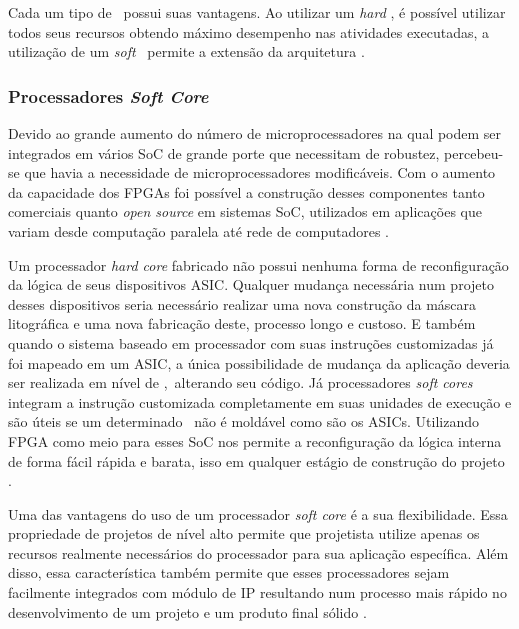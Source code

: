         Cada um tipo de \core\ possui suas vantagens.
        Ao utilizar um \textit{hard} \core, é possível utilizar todos seus recursos obtendo máximo desempenho nas atividades executadas, a utilização de um \textit{soft} \core\ permite a extensão da arquitetura \citep{Plessl2003}.
    
    
        \subsubsection{Processadores \textit{Soft Core}}
        
            Devido ao grande aumento do número de microprocessadores na qual podem ser integrados em vários SoC de grande porte que necessitam de robustez, percebeu-se que havia a necessidade de microprocessadores modificáveis. %
            Com o aumento da capacidade dos FPGAs foi possível a construção desses componentes tanto comerciais quanto \textit{open source} em sistemas SoC, utilizados em aplicações que variam desde computação paralela até rede de computadores \citep{kranenburg2010mb}.
            
            Um processador \textit{hard core} fabricado não possui nenhuma forma de reconfiguração da lógica de seus dispositivos ASIC.
            Qualquer mudança necessária num projeto desses dispositivos seria necessário realizar uma nova construção da máscara litográfica e uma nova fabricação deste, processo longo e custoso.
            E também quando o sistema baseado em processador com suas instruções customizadas já foi mapeado em um ASIC, a única possibilidade de mudança da aplicação deveria ser realizada em nível de \software,\ alterando seu código.
            Já processadores \textit{soft cores} integram a instrução customizada completamente em suas unidades de execução e são úteis se um determinado \hardware\ não é moldável como são os ASICs.
            Utilizando FPGA como meio para esses SoC nos permite a reconfiguração da lógica interna de forma fácil rápida e barata, isso em qualquer estágio de construção do projeto \citep{rosinger2004connecting}.
        
            Uma das vantagens do uso de um processador \textit{soft core} é a sua flexibilidade.
            Essa propriedade de projetos de nível alto permite que projetista utilize apenas os recursos realmente necessários do processador para sua aplicação específica.
            Além disso, essa característica também permite que esses processadores sejam facilmente integrados com módulo de IP resultando num processo mais rápido no desenvolvimento de um projeto e um produto final sólido \citep{rosinger2004connecting}.
        
